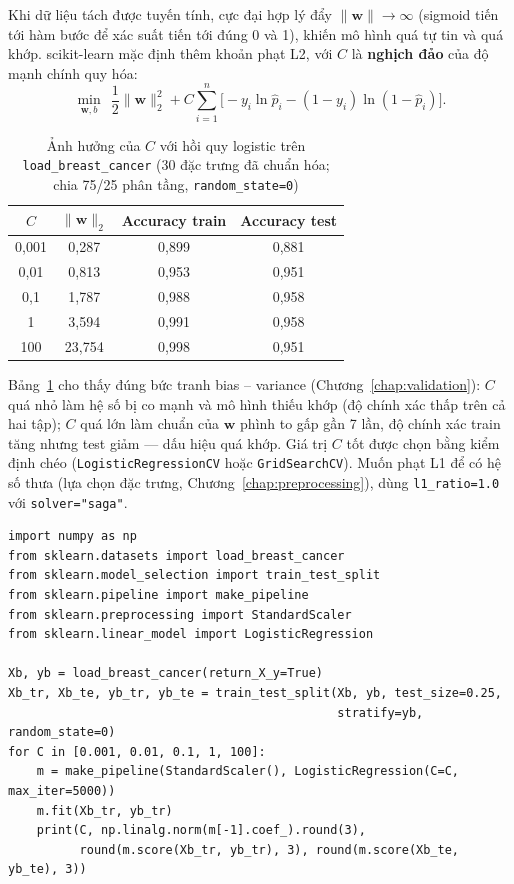 Khi dữ liệu tách được tuyến tính, cực đại hợp lý đẩy $\|\mathbf{w}\| \to \infty$ (sigmoid tiến tới hàm bước để xác suất tiến tới đúng 0 và 1), khiến mô hình quá tự tin và quá khớp. scikit-learn mặc định thêm khoản phạt L2, với $C$ là \textbf{nghịch đảo} của độ mạnh chính quy hóa:
\begin{equation}
    \min_{\mathbf{w}, b}\ \ \frac{1}{2}\|\mathbf{w}\|_2^2 + C\sum_{i=1}^{n}\Big[-y_i\ln\hat{p}_i - (1 - y_i)\ln(1 - \hat{p}_i)\Big].
\end{equation}

\begin{table}[H]
\centering
\begin{tabular}{|c|c|c|c|}
\hline
$C$ & $\|\mathbf{w}\|_2$ & \textbf{Accuracy train} & \textbf{Accuracy test} \\
\hline
0,001 & 0,287 & 0,899 & 0,881 \\ \hline
0,01 & 0,813 & 0,953 & 0,951 \\ \hline
0,1 & 1,787 & 0,988 & 0,958 \\ \hline
1 & 3,594 & 0,991 & 0,958 \\ \hline
100 & 23,754 & 0,998 & 0,951 \\ \hline
\end{tabular}
\caption{Ảnh hưởng của $C$ với hồi quy logistic trên \texttt{load\_breast\_cancer} (30 đặc trưng đã chuẩn hóa; chia 75/25 phân tầng, \texttt{random\_state=0})}
\label{tab:logreg-C}
\end{table}

Bảng~\ref{tab:logreg-C} cho thấy đúng bức tranh bias -- variance (Chương~\ref{chap:validation}): $C$ quá nhỏ làm hệ số bị co mạnh và mô hình thiếu khớp (độ chính xác thấp trên cả hai tập); $C$ quá lớn làm chuẩn của $\mathbf{w}$ phình to gấp gần 7 lần, độ chính xác train tăng nhưng test giảm --- dấu hiệu quá khớp. Giá trị $C$ tốt được chọn bằng kiểm định chéo (\texttt{LogisticRegressionCV} hoặc \texttt{GridSearchCV}). Muốn phạt L1 để có hệ số thưa (lựa chọn đặc trưng, Chương~\ref{chap:preprocessing}), dùng \texttt{l1\_ratio=1.0} với \texttt{solver="saga"}.

\begin{lstlisting}[caption={Đường chính quy hóa của hồi quy logistic}]
import numpy as np
from sklearn.datasets import load_breast_cancer
from sklearn.model_selection import train_test_split
from sklearn.pipeline import make_pipeline
from sklearn.preprocessing import StandardScaler
from sklearn.linear_model import LogisticRegression

Xb, yb = load_breast_cancer(return_X_y=True)
Xb_tr, Xb_te, yb_tr, yb_te = train_test_split(Xb, yb, test_size=0.25,
                                              stratify=yb, random_state=0)
for C in [0.001, 0.01, 0.1, 1, 100]:
    m = make_pipeline(StandardScaler(), LogisticRegression(C=C, max_iter=5000))
    m.fit(Xb_tr, yb_tr)
    print(C, np.linalg.norm(m[-1].coef_).round(3),
          round(m.score(Xb_tr, yb_tr), 3), round(m.score(Xb_te, yb_te), 3))
\end{lstlisting}

